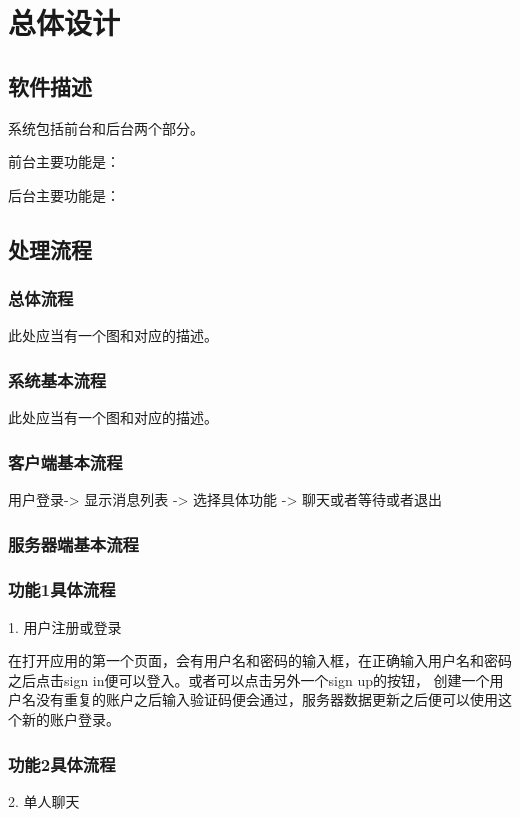 \chapter{总体设计}
\section{软件描述}
系统包括前台和后台两个部分。

前台主要功能是：

后台主要功能是：

\section{处理流程}
\subsection{总体流程}
此处应当有一个图和对应的描述。

\subsection{系统基本流程}
此处应当有一个图和对应的描述。

\subsection{客户端基本流程}
用户登录-> 显示消息列表 -> 选择具体功能 -> 聊天或者等待或者退出

\subsection{服务器端基本流程}


\subsection{功能1具体流程}


1. 用户注册或登录

在打开应用的第一个页面，会有用户名和密码的输入框，在正确输入用户名和密码之后点击sign in便可以登入。或者可以点击另外一个sign up的按钮，
创建一个用户名没有重复的账户之后输入验证码便会通过，服务器数据更新之后便可以使用这个新的账户登录。


\subsection{功能2具体流程}

2. 单人聊天

